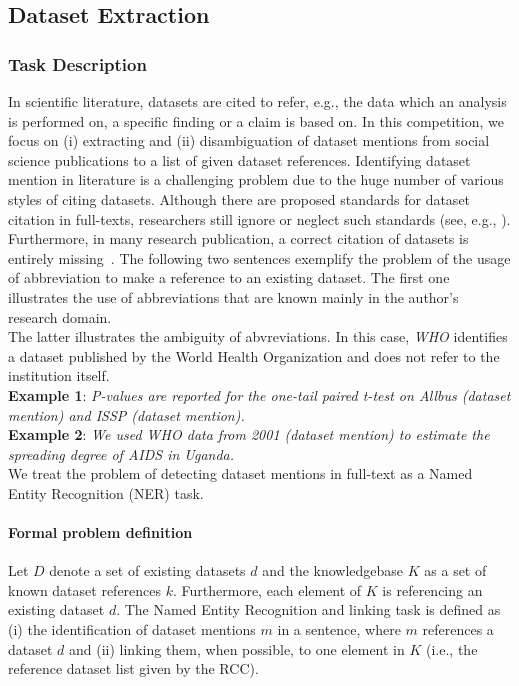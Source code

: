 \subsection{Dataset Extraction}
\label{sec:dataset-extraction}
\subsubsection{Task Description}
In scientific literature, datasets are cited to refer, e.g., the data which an analysis is performed on, a specific finding or a claim is based on.
In this competition, we focus on (i) extracting and (ii) disambiguation of dataset mentions from social science publications to a list of given dataset references.
Identifying dataset mention in literature is a challenging problem due to the huge number of various styles of citing datasets. Although there are proposed standards for dataset citation in full-texts, researchers still ignore or neglect such standards (see, e.g., \cite{altman2007proposed}).
Furthermore, in many research publication, a correct citation of datasets is entirely missing~\cite{boland2012identifying}. 
The following two sentences exemplify the problem of the usage of abbreviation to make a reference to an existing dataset.
The first one illustrates the use of abbreviations that are known mainly in the author's research domain.\\
The latter illustrates the ambiguity of abvreviations.
In this case, \emph{WHO} identifies a dataset published by the World Health Organization and does not refer to the institution itself.\\
\textbf{Example 1}: \emph{P-values are reported for the one-tail paired t-test on \emph{Allbus} (dataset mention) and \emph{ISSP} (dataset mention).}\\
\textbf{Example 2}: \emph{We used \emph{WHO data from 2001} (dataset mention) to estimate the spreading degree of AIDS in Uganda.}\\
We treat the problem of detecting dataset mentions in full-text as a Named Entity Recognition (NER) task. 
\paragraph{Formal problem definition}%
Let $D$ denote a set of existing datasets $d$ and the knowledgebase $K$ as a set of known dataset references $k$. Furthermore, each element of $K$ is referencing an existing dataset $d$. The Named Entity Recognition and linking task is defined as (i) the identification of dataset mentions $m$ in a sentence, where $m$ references a dataset $d$ and (ii) linking them, when possible, to one element in $K$ (i.e., the reference dataset list given by the RCC). 


